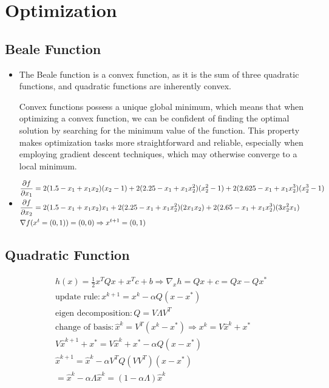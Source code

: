 \documentclass{article}
\begin{document}
\section{Optimization}
\subsection{Beale Function}
\begin{itemize}
\item 
The Beale function is a convex function, as it is the sum of three 
quadratic functions, and quadratic functions are inherently convex.

Convex functions possess a unique global minimum, which means that 
when optimizing a convex function, we can be confident of finding 
the optimal solution by searching for the minimum value of the 
function. This property makes optimization tasks more straightforward
and reliable, especially when employing gradient descent techniques, 
which may otherwise converge to a local minimum.

\item 
\begin{align*}
    &\pdv{f}{x_1} = 2(1.5 - x_1 + x_1 x_2)(x_2 - 1) + 2(2.25 - x_1 + x_1x_2^2)(x_2^2 - 1)
    +2(2.625 - x_1 + x_1x_2^3)(x_2^3 - 1) \\
    &\pdv{f}{x_2} = 2(1.5 - x_1 + x_1x_2)x_1 + 2(2.25 - x_1 + x_1x_2^2)(2x_1x_2) +
    2(2.65 - x_1 + x_1x_2^3)(3x_2^2x_1)\\
    &\nabla f(x^t = (0, 1)) = (0, 0) \Rightarrow x^{t + 1} = (0, 1) 
\end{align*}
\end{itemize}

\subsection{Quadratic Function}
\begin{align*}
    &h(x) = \frac{1}{2}x^TQx + x^Tc + b \Rightarrow \nabla_x h = Qx + c = Qx - Qx^* \\
    &\text{update rule}: x^{k + 1} = x^k - \alpha Q(x - x^*) \\
    &\text{eigen decomposition}: Q = V \Lambda V^{T} \\
    &\text{change of basis}: \hat{x}^k = V^T(x^k - x^*) \Rightarrow x^k = V\hat{x}^k + x^*\\
    &V\hat{x}^{k + 1} + x^* = V\hat{x}^k + x^* -\alpha Q(x - x^*) \\
    &\hat{x}^{k + 1} = \hat{x}^k -\alpha V^T Q (VV^T)(x - x^*) \\
    &= \hat{x}^k -\alpha  \Lambda \hat{x}^k =(1 - \alpha \Lambda)\hat{x}^k \\
\end{align*}
\end{document}

